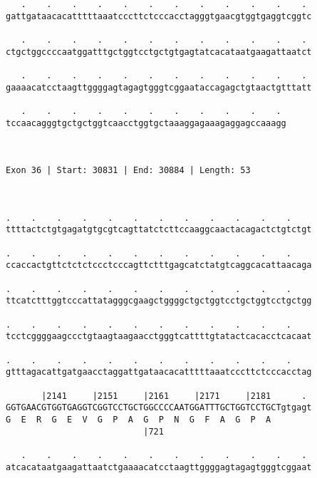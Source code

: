 \documentclass{article}
\begin{document}
\begin{Verbatim}
   .    .    .    .    .    .    .    .    .    .    .    . 
gattgataacacatttttaaatcccttctcccacctagggtgaacgtggtgaggtcggtc
                                                            
   .    .    .    .    .    .    .    .    .    .    .    . 
ctgctggccccaatggatttgctggtcctgctgtgagtatcacataatgaagattaatct
                                                            
   .    .    .    .    .    .    .    .    .    .    .    . 
gaaaacatcctaagttggggagtagagtgggtcggaataccagagctgtaactgtttatt
                                                            
   .    .    .    .    .    .    .    .    .    .    . 
tccaacagggtgctgctggtcaacctggtgctaaaggagaaagaggagccaaagg
                                                       
                                                       
 
Exon 36 | Start: 30831 | End: 30884 | Length: 53



.    .    .    .    .    .    .    .    .    .    .    .    
ttttactctgtgagatgtgcgtcagttatctcttccaaggcaactacagactctgtctgt
                                                            
.    .    .    .    .    .    .    .    .    .    .    .    
ccaccactgttctctctccctcccagttctttgagcatctatgtcaggcacattaacaga
                                                            
.    .    .    .    .    .    .    .    .    .    .    .    
ttcatctttggtcccattatagggcgaagctggggctgctggtcctgctggtcctgctgg
                                                            
.    .    .    .    .    .    .    .    .    .    .    .    
tcctcggggaagccctgtaagtaagaacctgggtcattttgtatactcacacctcacaat
                                                            
.    .    .    .    .    .    .    .    .    .    .    .    
gtttagacattgatgaacctaggattgataacacatttttaaatcccttctcccacctag
                                                            
       |2141     |2151     |2161     |2171     |2181      . 
GGTGAACGTGGTGAGGTCGGTCCTGCTGGCCCCAATGGATTTGCTGGTCCTGCTgtgagt
G  E  R  G  E  V  G  P  A  G  P  N  G  F  A  G  P  A        
                           |721                             
  
   .    .    .    .    .    .    .    .    .    .    .    . 
atcacataatgaagattaatctgaaaacatcctaagttggggagtagagtgggtcggaat
                                                            

\end{Verbatim}
\end{document}
